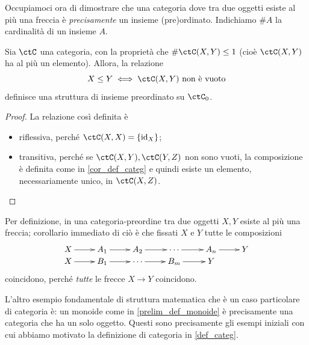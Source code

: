 Occupiamoci ora di dimostrare che una categoria dove tra due oggetti esiste al più una freccia è \emph{precisamente} un insieme (pre)ordinato. Indichiamo \(\# A\) la cardinalità di un insieme \(A\).
\begin{theorem}\label{cat_sonopos}
 Sia \(\ctC\) una categoria, con la proprietà che \(\#\Hom{\ctC}(X,Y) \le 1\) (cioè \(\Hom{\ctC}(X,Y)\) ha al più un elemento). Allora, la relazione
 \[X\le Y \iff \Hom{\ctC}(X,Y) \text{ non è vuoto}\]
 definisce una struttura di insieme preordinato su \(\ctC_0\).
\end{theorem}
\begin{proof}
 La relazione così definita è
 \begin{itemize}
  \item riflessiva, perché \(\Hom{\ctC}(X,X) = \{\id_X\}\);
  \item transitiva, perché se \(\Hom{\ctC}(X,Y), \Hom{\ctC}(Y,Z)\) non sono vuoti, la composizione è definita come in \ref{cor_def_categ} e quindi esiste un elemento, necessariamente unico, in \(\Hom{\ctC}(X,Z)\).\qedhere
 \end{itemize}
\end{proof}
\begin{remark}\label{cor_di_sonopos}
 Per definizione, in una categoria-preordine tra due oggetti \(X,Y\) esiste al più una freccia; corollario immediato di ciò è che fissati \(X\) e \(Y\) tutte le composizioni
 \[\xymatrix@R=0mm{
  X \ar[r] & A_1\ar[r] & A_2 \ar[r]& \cdots \ar[r]& A_n \ar[r] & Y \\
  X \ar[r] & B_1\ar[r] & \cdots \ar[r] & B_m \ar[r] & Y \\
  }\]
 coincidono, perché \emph{tutte} le frecce \(X\to Y\) coincidono.
\end{remark}
L'altro esempio fondamentale di struttura matematica che è un caso particolare di categoria è: un monoide come in \ref{prelim_def_monoide} è precisamente una categoria che ha un solo oggetto. Questi sono precisamente gli esempi iniziali con cui abbiamo motivato la definizione di categoria in \ref{def_categ}.
